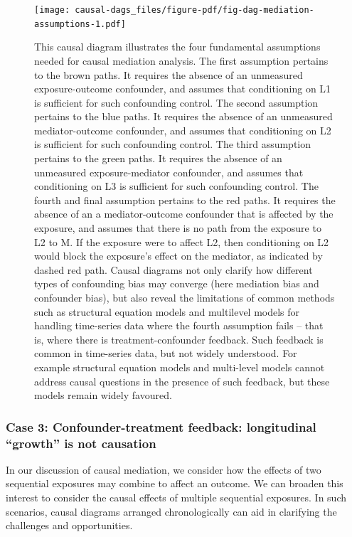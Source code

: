 \documentclass[
  singlecolumn,
  9pt]{article}
\begin{document}
\begin{figure}

{\centering \texttt{[image: causal-dags\_files/figure-pdf/fig-dag-mediation-assumptions-1.pdf]}

}

\caption{\label{fig-dag-mediation-assumptions}This causal diagram
illustrates the four fundamental assumptions needed for causal mediation
analysis. The first assumption pertains to the brown paths. It requires
the absence of an unmeasured exposure-outcome confounder, and assumes
that conditioning on L1 is sufficient for such confounding control. The
second assumption pertains to the blue paths. It requires the absence of
an unmeasured mediator-outcome confounder, and assumes that conditioning
on L2 is sufficient for such confounding control. The third assumption
pertains to the green paths. It requires the absence of an unmeasured
exposure-mediator confounder, and assumes that conditioning on L3 is
sufficient for such confounding control. The fourth and final assumption
pertains to the red paths. It requires the absence of an a
mediator-outcome confounder that is affected by the exposure, and
assumes that there is no path from the exposure to L2 to M. If the
exposure were to affect L2, then conditioning on L2 would block the
exposure's effect on the mediator, as indicated by dashed red path.
Causal diagrams not only clarify how different types of confounding bias
may converge (here mediation bias and confounder bias), but also reveal
the limitations of common methods such as structural equation models and
multilevel models for handling time-series data where the fourth
assumption fails -- that is, where there is treatment-confounder
feedback. Such feedback is common in time-series data, but not widely
understood. For example structural equation models and multi-level
models cannot address causal questions in the presence of such feedback,
but these models remain widely favoured.}

\end{figure}

\subsubsection{Case 3: Confounder-treatment feedback: longitudinal
``growth'' is not
causation}\label{case-3-confounder-treatment-feedback-longitudinal-growth-is-not-causation}

In our discussion of causal mediation, we consider how the effects of
two sequential exposures may combine to affect an outcome. We can
broaden this interest to consider the causal effects of multiple
sequential exposures. In such scenarios, causal diagrams arranged
chronologically can aid in clarifying the challenges and opportunities.
\end{document}
